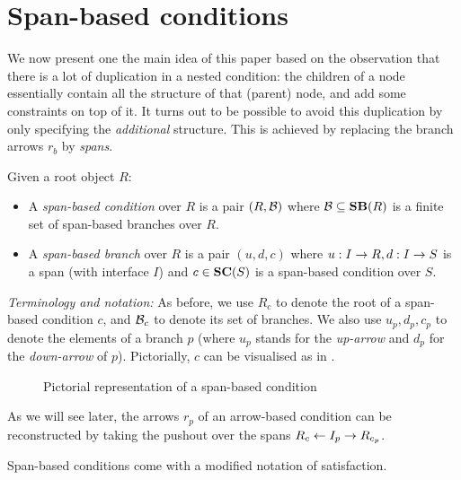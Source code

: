 \section{Span-based conditions}

We now present one the main idea of this paper based on the observation that there is a lot of duplication in a nested condition: the children of a node essentially contain all the structure of that (parent) node, and add some constraints on top of it. It turns out to be possible to avoid this duplication by only specifying the \emph{additional} structure. This is achieved by replacing the branch arrows $r_b$ by \emph{spans}.


\begin{definition}
  Given a root object $R$:
  \begin{itemize}
  \item A \emph{span-based condition} over $R$ is a pair $(R,\mathcal{B})$ where $\cB\subseteq \SB R$ is a finite set of span-based branches over $R$.
  \item A \emph{span-based branch} over $R$ is a pair $(u,d,c)$ where $u:I\rightarrow R,d:I\rightarrow S$ is a span (with interface $I$) and $c\in \SC S$ is a span-based condition over $S$.
  \end{itemize}
\end{definition}
%
\emph{Terminology and notation:} As before, we use $R_c$ to denote the root of a span-based condition $c$, and $\mathcal{B}_c$ to denote its set of branches. We also use $u_p,d_p,c_p$ to denote the elements of a branch $p$ (where $u_p$ stands for the \emph{up-arrow} and $d_p$ for the \emph{down-arrow} of $p$). Pictorially, $c$ can be visualised as in .
%
\begin{figure}
  \centering
  
  \caption{Pictorial representation of a span-based condition}
\end{figure}
%
As we will see later, the arrows $r_p$ of an arrow-based condition can be reconstructed by taking the pushout over the spans $R_c\leftarrow I_p\rightarrow R_{c_p}$.

\medskip\noindent Span-based conditions come with a modified notation of satisfaction.

